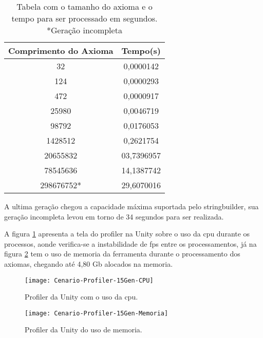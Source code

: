 \begin{table}[!h]
	\centering
	\begin{tabular}{|c|c|}
		\hline
		\textbf{Comprimento do Axioma} & \textbf{Tempo(s)} \\ \hline
		32                             & 0,0000142         \\ \hline
		124                            & 0,0000293         \\ \hline
		472                            & 0,0000917         \\ \hline
		25980                          & 0,0046719         \\ \hline
		98792                          & 0,0176053         \\ \hline
		1428512                        & 0,2621754         \\ \hline
		20655832                       & 03,7396957        \\ \hline
		78545636                       & 14,1387742        \\ \hline
		298676752*                     & 29,6070016        \\ \hline
	\end{tabular}
	\caption{Tabela com o tamanho do axioma e o tempo para ser processado em segundos. *Geração incompleta}
	\label{axiomaTempoTabela}
\end{table}

A ultima geração chegou a capacidade máxima suportada pelo stringbuilder, sua geração incompleta levou em torno de 34 segundos para ser realizada.

A figura \ref{profilerCPU} apresenta a tela do profiler na Unity sobre o uso da cpu durante os processos, aonde verifica-se a instabilidade de fps entre os processamentos, já na figura \ref{profilerMemoria} tem o uso de memoria da ferramenta durante o processamento dos axiomas, chegando até 4,80 Gb alocados na memoria.
\begin{figure}[]
	\centering
	\texttt{[image: Cenario-Profiler-15Gen-CPU]}
	\caption{Profiler da Unity com o uso da cpu.}
	\label{profilerCPU}
\end{figure}

\begin{figure}[]
	\centering
	\texttt{[image: Cenario-Profiler-15Gen-Memoria]}
	\caption{Profiler da Unity do uso de memoria.}
	\label{profilerMemoria}
\end{figure}